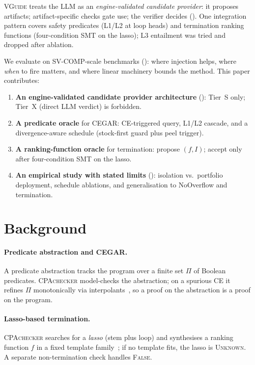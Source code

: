 \documentclass[runningheads]{llncs}
\newcommand{\tool}{\textsc{VGuide}}
\newcommand{\cpa}{\textsc{CPAchecker}}
\begin{document}
\tool{} treats the LLM as an \emph{engine-validated candidate provider}: it proposes artifacts;
artifact-specific checks gate use; the verifier decides (). One integration
pattern covers safety predicates (L1/L2 at loop heads) and termination ranking functions
(four-condition SMT on the lasso); L3 entailment was tried and dropped after ablation.

We evaluate on SV-COMP-scale benchmarks (): where injection helps, where
\emph{when} to fire matters, and where linear machinery bounds the method. This paper contributes:

\begin{enumerate}
  \item \textbf{An engine-validated candidate provider architecture} (): Tier~S
        only; Tier~X (direct LLM verdict) is forbidden.
  \item \textbf{A predicate oracle} for CEGAR: CE-triggered query, L1/L2 cascade, and a
        divergence-aware schedule (stock-first guard plus peel trigger).
  \item \textbf{A ranking-function oracle} for termination: propose $(f,I)$; accept only after
        four-condition SMT on the lasso.
  \item \textbf{An empirical study with stated limits} ():
        isolation vs.\ portfolio deployment, schedule ablations, and
        generalisation to NoOverflow and termination.
\end{enumerate}

\section{Background}
\label{sec:background}

\paragraph{Predicate abstraction and CEGAR.}
A predicate abstraction tracks the program over a finite set $\Pi$ of Boolean predicates.
\cpa{} model-checks the abstraction; on a spurious CE it refines $\Pi$ monotonically via
interpolants~\cite{interpolation2003}, so a proof on the abstraction is a proof on the program.

\paragraph{Lasso-based termination.}
\cpa{} searches for a \emph{lasso} (stem plus loop) and synthesises a ranking function $f$ in a
fixed template family~\cite{ranking2004,ultimate2014}; if no template fits, the lasso is
\textsc{Unknown}. A separate non-termination check handles \textsc{False}.
\end{document}
